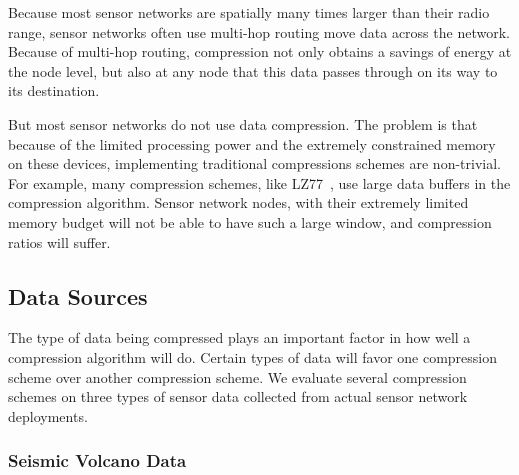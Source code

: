 Because most sensor networks are spatially many times larger than
their radio range, sensor networks often use multi-hop routing move
data across the network.  Because of multi-hop routing, compression
not only obtains a savings of energy at the node level, but also at
any node that this data passes through on its way to its destination. 

But most sensor networks do not use data compression.  The problem is
that because of the limited processing power and the extremely
constrained memory on these devices, implementing traditional
compressions schemes are non-trivial.  For example, many compression
schemes, like LZ77~\cite{lz77}, use large data buffers in the
compression algorithm.  Sensor network nodes, with their extremely
limited memory budget will not be able to have such a large window,
and compression ratios will suffer.

\subsection{Data Sources} 

The type of data being compressed plays an important factor in how
well a compression algorithm will do.  Certain types of data will
favor one compression scheme over another compression scheme.  We
evaluate several compression schemes on three types of sensor data
collected from actual sensor network deployments.  

\subsubsection{Seismic Volcano Data}

